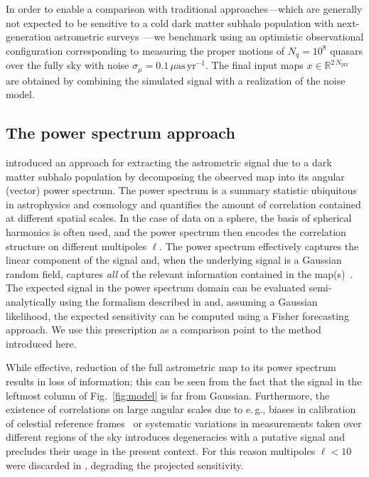 \documentclass[twocolumn]{aastex631}
\newcommand{\eg}{{e.\,g.}\xspace}
\begin{document}
In order to enable a comparison with traditional approaches---which are generally not expected to be sensitive to a cold dark matter subhalo population with next-generation astrometric surveys~\citep{VanTilburg:2018ykj,Mishra-Sharma:2020ynk}---we benchmark using an optimistic observational configuration corresponding to measuring the proper motions of $N_q = 10^8$ quasars {over the fully sky} with noise $\sigma_{\mu} = 0.1\,\mu\mathrm{as}\,\mathrm{yr}^{-1}$. {The final input maps $x\in\mathbb R^{2\,N_\mathrm{pix}}$ are obtained by combining the simulated signal with a realization of the noise model.}

\subsection{The power spectrum approach} 

\citet{Mishra-Sharma:2020ynk} introduced an approach for extracting the astrometric signal due to a dark matter subhalo population by decomposing the observed map into its angular (vector) power spectrum. The power spectrum is a summary statistic ubiquitous in astrophysics and cosmology and quantifies the amount of correlation contained at different spatial scales. In the case of data on a sphere, the basis of spherical harmonics is often used, and the power spectrum then encodes the correlation structure on different multipoles $\ell$. The power spectrum effectively captures the linear component of the signal and, when the underlying signal is a Gaussian random field, captures \emph{all} of the relevant information contained in the map(s)~\citep{Tegmark:1996qt}.
The expected signal in the power spectrum domain can be evaluated semi-analytically using the formalism described in \citet{Mishra-Sharma:2020ynk} and, assuming a Gaussian likelihood, the expected sensitivity can be computed using a Fisher forecasting approach. We use this prescription as a comparison point to the method introduced here.

While effective, reduction of the full astrometric map to its power spectrum results in loss of information; this can be seen from the fact that the signal in the leftmost column of Fig.~\ref{fig:model} is far from Gaussian. Furthermore, the existence of correlations on large angular scales due to \eg, biases in calibration of celestial reference frames~\citep{2018A&A...616A..14G} or systematic variations in measurements taken over different regions of the sky introduces degeneracies with a putative signal and precludes their usage in the present context. For this reason multipoles $\ell < 10$ were discarded in \citet{Mishra-Sharma:2020ynk}, degrading the projected sensitivity.
\end{document}
